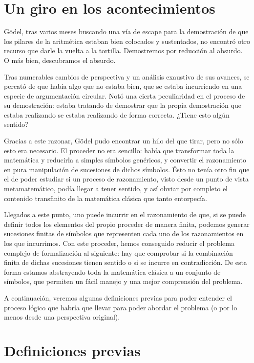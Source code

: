 \section{Un giro en los acontecimientos}

Gödel, tras varios meses buscando una vía de escape para la demostración de que los pilares de la aritmética estaban bien colocados y sustentados, no encontró otro recurso que darle la vuelta a la tortilla. Demostremos por reducción 
al absurdo. O más bien, descubramos el absurdo. 

Tras numerables cambios de perspectiva y un análisis exaustivo de sus avances, se percató de que había algo que no estaba bien, que se estaba incurriendo en una especie de argumentación circular. Notó una cierta peculiaridad en el proceso
de su demostración: estaba tratando de demostrar que la propia demostración que estaba realizando se estaba realizando de forma correcta. ¿Tiene esto algún sentido?

Gracias a este razonar, Gödel pudo encontrar un hilo del que tirar, pero no sólo esto era necesario. El proceder no era sencillo: había que transformar toda la matemática y reducirla a simples símbolos genéricos, y convertir el razonamiento en pura manipulación 
de sucesiones de dichos símbolos. Ésto no tenía otro fin que el de poder estudiar si un proceso de razonamiento, visto desde un punto de vista metamatemático, podía llegar a tener sentido, y así obviar por completo el contenido transfinito
de la matemática clásica que tanto entorpecía.

Llegados a este punto, uno puede incurrir en el razonamiento de que, si se puede definir todos los elementos del propio proceder de manera finita, podemos generar sucesiones finitas de símbolos que representen cada uno de los 
razonamientos en los que incurrimos. Con este proceder, hemos conseguido reducir el problema complejo de formalización al siguiente: hay que comprobar si la combinación finita de dichas sucesiones tienen sentido o si se incurre en contradicción.
De esta forma estamos abstrayendo toda la matemática clásica a un conjunto de símbolos, que permiten un fácil manejo y una mejor comprensión del problema.

A continuación, veremos algunas definiciones previas para poder entender el proceso lógico que habría que llevar para poder abordar el problema (o por lo menos desde una perspectiva original).

\section{Definiciones previas}


